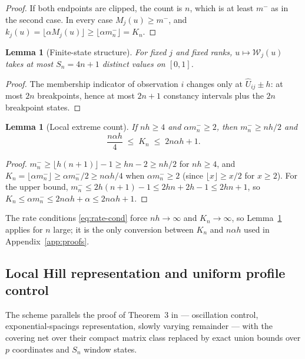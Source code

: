 \documentclass[bj,authoryear]{imsart}
\theoremstyle{plain}
\newtheorem{lemma}[theorem]{Lemma}
\begin{document}
\begin{appendix}
\begin{proof}
If both endpoints are clipped, the count is $n$, which is at least
$m^-$ as in the second case.  In every case $M_j(u)\ge m^-$, and
$k_j(u)=\lfloor\alpha M_j(u)\rfloor\ge\lfloor\alpha m_n^-\rfloor=K_n$.
\end{proof}

\begin{lemma}[Finite-state structure]\label{lem:app-states}
For fixed $j$ and fixed ranks, $u\mapsto\mathcal W_j(u)$ takes at most
$S_n=4n+1$ distinct values on $[0,1]$.
\end{lemma}

\begin{proof}
The membership indicator of observation $i$ changes only at
$\widehat U_{ij}\pm h$: at most $2n$ breakpoints, hence at most $2n+1$
constancy intervals plus the $2n$ breakpoint states.
\end{proof}

\begin{lemma}[Local extreme count]\label{lem:app-kn}
If $nh\ge4$ and $\alpha m_n^-\ge2$, then $m_n^-\ge nh/2$ and
\[
 \frac{n\alpha h}{4}\;\le\;K_n\;\le\;2n\alpha h+1 .
\]
\end{lemma}

\begin{proof}
$m_n^-\ge\lfloor h(n+1)\rfloor-1\ge h n-2\ge nh/2$ for $nh\ge4$, and
$K_n=\lfloor\alpha m_n^-\rfloor\ge\alpha m_n^-/2\ge n\alpha h/4$ when
$\alpha m_n^-\ge2$ (since $\lfloor x\rfloor\ge x/2$ for $x\ge2$).  For the upper bound, $m_n^-\le2h(n+1)-1\le2hn+2h-1\le2hn+1$, so
$K_n\le\alpha m_n^-\le2n\alpha h+\alpha\le2n\alpha h+1$.
\end{proof}

The rate conditions \eqref{eq:rate-cond} force $nh\to\infty$ and
$K_n\to\infty$, so Lemma~\ref{lem:app-kn} applies for $n$ large; it is
the only conversion between $K_n$ and $n\alpha h$ used in
Appendix~\ref{app:proofs}.

\subsection{Local Hill representation and uniform profile control}
\label{app:hill}

The scheme parallels the proof of Theorem~3 in
\citet{gardesPodgorny2025} --- oscillation control,
exponential-spacings representation, slowly varying remainder --- with
the covering net over their compact matrix class replaced by exact union
bounds over $p$ coordinates and $S_n$ window states.


\end{appendix}
\end{document}
